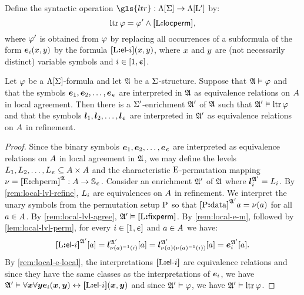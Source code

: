 \begin{definition}
Define the syntactic operation $\gls{ltr} : \aLF\sigS \to \aLF\LSp$
by:
\[
  \operatorname{ltr}\varphi = {\varphi'} \land {\bm{[}\mathrm{L}\mathord{\bm{:}}\mathsf{locperm}\bm{]}},
\]
where ${\varphi'}$ is obtained from $\varphi$ by replacing all occurrences of a
subformula of the form $\bm{e}_{i}(x,y)$ by the formula ${\bm{[}\mathrm{L}\mathord{\bm{:}}\mathsf{el}{\hbox{-}}i\bm{]}}(x,y)$, 
where $x$ and $y$ are (not necessarily distinct) variable symbols and
$i \in [1,\upepsilon]$.
\end{definition}
\begin{remark}
Let $\varphi$ be a $\Lambda[\mathrm{\Sigma}]$-formula and let $\mathfrak{A}$ be a $\mathrm{\Sigma}$-structure.
Suppose that $\mathfrak{A} \vDash \varphi$ and that the symbols 
$\bm{e}_{1}, \bm{e}_{2}, \dots, \bm{e}_{\upepsilon}$ are interpreted in $\mathfrak{A}$ as equivalence
relations on $A$ in local agreement.
Then there is a $\mathrm{\Sigma'}$-enrichment $\mathfrak{A'}$ of $\mathfrak{A}$ such that
$\mathfrak{A'} \vDash \operatorname{ltr}\varphi$ and that the symbols 
$\bm{l}_{1}, \bm{l}_{2}, \dots, \bm{l}_{\upepsilon}$ are interpreted in $\mathfrak{A'}$ as equivalence
relations on $A$ in refinement.
\end{remark}
\begin{proof}
Since the binary symbols $\bm{e}_{1}, \bm{e}_{2}, \dots, \bm{e}_{\upepsilon}$ are interpreted as
equivalence relations on $A$ in local agreement in $\mathfrak{A}$, we may define
the levels $L_{1}, L_{2}, \dots, L_{\upepsilon} \subseteq {A\times A}$
and the characteristic $\mathrm{E}$-permutation mapping 
$\nu = {\bm{[}\mathrm{E}\mathord{\bm{:}}\mathrm{chperm}\bm{]}}^{\mathfrak{A}} : A \to \mathbb{S}_{\upepsilon}$.
Consider an enrichment $\mathfrak{A'}$ of $\mathfrak{A}$ where 
$\bm{l}_{i}^{\mathfrak{A'}} = L_{i}$.
By \cref{rem:local-lvl-refine}, $L_{i}$ are equivalences on $A$ in
refinement.
We interpret the unary symbols from the
permutation setup $\mathrm{P}$ so that ${\bm{[}\mathrm{P}\mathord{\bm{:}}\mathrm{data}\bm{]}}^{\mathfrak{A'}}a = \nu(a)$ for all
$a \in A$.
By \cref{rem:local-lvl-agree}, $\mathfrak{A'} \vDash {\bm{[}\mathrm{L}\mathord{\bm{:}}\mathsf{fixperm}\bm{]}}$.
By \cref{rem:local-e-m}, followed by \cref{lem:local-lvl-perm},
for every $i \in [1,\upepsilon]$ and $a \in A$ we have:
\[
  {\bm{[}\mathrm{L}\mathord{\bm{:}}\mathsf{el}{\hbox{-}}i\bm{]}}^{\mathfrak{A'}}[a] =
  \bm{l}_{\nu(a)^{-1}(i)}^{\mathfrak{A'}}[a] =
  \bm{l}_{\nu(a)(\nu(a)^{-1}(i))}^{\mathfrak{A'}}[a] =
  \bm{e}_{i}^{\mathfrak{A'}}[a].
\]
By \cref{rem:local-e-local}, the interpretations ${\bm{[}\mathrm{L}\mathord{\bm{:}}\mathsf{el}{\hbox{-}}i\bm{]}}$ are
equivalence relations and since they have the same classes as the
interpretations of $\bm{e}_{i}$, we have 
$\mathfrak{A'} \vDash \forall\bm{x} \forall\bm{y} \bm{e}_{i}(\bm{x},\bm{y}) \leftrightarrow {\bm{[}\mathrm{L}\mathord{\bm{:}}\mathsf{el}{\hbox{-}}i\bm{]}}(\bm{x},\bm{y})$
and since $\mathfrak{A'} \vDash \varphi$, we have $\mathfrak{A'} \vDash \operatorname{ltr}\varphi$.
\end{proof}

